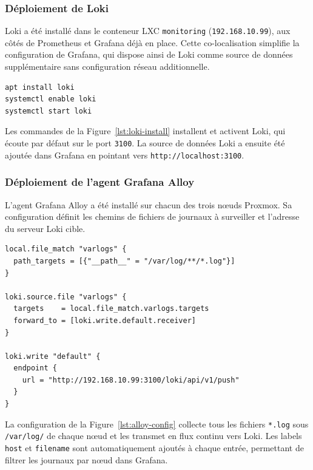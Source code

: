 \subsubsection{Déploiement de Loki}

\par Loki a été installé dans le conteneur LXC \texttt{monitoring} (\texttt{192.168.10.99}), aux côtés de Prometheus et Grafana déjà en place. Cette co-localisation simplifie la configuration de Grafana, qui dispose ainsi de Loki comme source de données supplémentaire sans configuration réseau additionnelle.\\

\begin{lstlisting}[style=sonacode,language=bash,caption={Installation de Loki},label={lst:loki-install}]
apt install loki
systemctl enable loki
systemctl start loki
\end{lstlisting}

\par Les commandes de la Figure~\ref{lst:loki-install} installent et activent Loki, qui écoute par défaut sur le port \texttt{3100}. La source de données Loki a ensuite été ajoutée dans Grafana en pointant vers \texttt{http://localhost:3100}.

\subsubsection{Déploiement de l'agent Grafana Alloy}

\par L'agent Grafana Alloy a été installé sur chacun des trois nœuds Proxmox. Sa configuration définit les chemins de fichiers de journaux à surveiller et l'adresse du serveur Loki cible.\\

\begin{lstlisting}[style=sonacode,language={},caption={Configuration de l'agent Alloy pour la collecte des journaux},label={lst:alloy-config}]
local.file_match "varlogs" {
  path_targets = [{"__path__" = "/var/log/**/*.log"}]
}

loki.source.file "varlogs" {
  targets    = local.file_match.varlogs.targets
  forward_to = [loki.write.default.receiver]
}

loki.write "default" {
  endpoint {
    url = "http://192.168.10.99:3100/loki/api/v1/push"
  }
}
\end{lstlisting}

\par La configuration de la Figure~\ref{lst:alloy-config} collecte tous les fichiers \texttt{*.log} sous \texttt{/var/log/} de chaque nœud et les transmet en flux continu vers Loki. Les labels \texttt{host} et \texttt{filename} sont automatiquement ajoutés à chaque entrée, permettant de filtrer les journaux par nœud dans Grafana.

